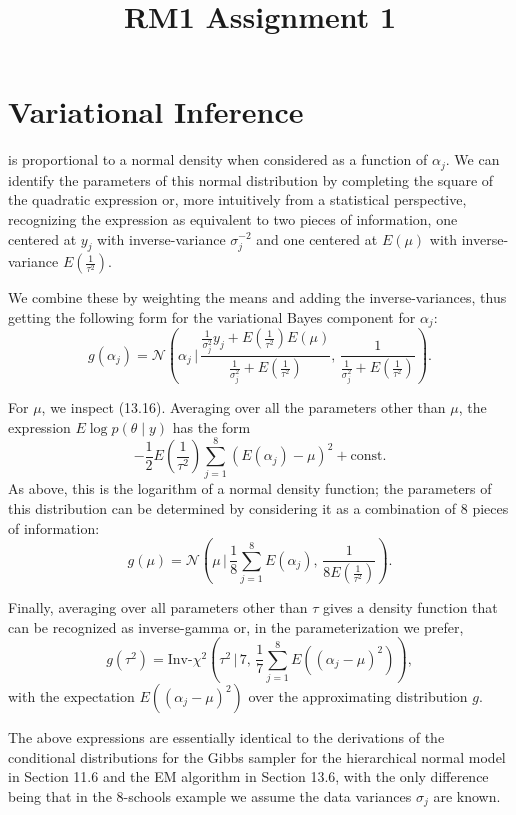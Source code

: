 \documentclass{article}
\title{RM1 Assignment 1}
\begin{document}
\section*{Variational Inference}

is proportional to a normal density when considered as a function of $\alpha_j$. We can 
identify the parameters of this normal distribution by completing the square of the 
quadratic expression or, more intuitively from a statistical perspective, recognizing the 
expression as equivalent to two pieces of information, one centered at $y_j$ 
with inverse-variance $\sigma_j^{-2}$ and one centered at $E(\mu)$ with inverse-variance 
$E(\frac{1}{\tau^2})$. 

We combine these by weighting the means and adding the inverse-variances, thus 
getting the following form for the variational Bayes component for $\alpha_j$:
\[
g(\alpha_j) = \mathcal{N}\left(\alpha_j \, \Bigg| \, 
\frac{\frac{1}{\sigma_j^2}y_j + E\left(\frac{1}{\tau^2}\right)E(\mu)}
{\frac{1}{\sigma_j^2} + E\left(\frac{1}{\tau^2}\right)}, \,
\frac{1}{\frac{1}{\sigma_j^2} + E\left(\frac{1}{\tau^2}\right)} 
\right). \tag{13.18}
\]

For $\mu$, we inspect (13.16). Averaging over all the parameters other than $\mu$, the 
expression $E \log p(\theta \mid y)$ has the form 
\[
-\frac{1}{2}E\left(\frac{1}{\tau^2}\right) \sum_{j=1}^8 (E(\alpha_j) - \mu)^2 + \text{const}.
\]
As above, this is the logarithm of a normal density function; the parameters of this distribution 
can be determined by considering it as a combination of 8 pieces of information:
\[
g(\mu) = \mathcal{N}\left(\mu \, \Bigg| \, 
\frac{1}{8} \sum_{j=1}^8 E(\alpha_j), \,
\frac{1}{8 E\left(\frac{1}{\tau^2}\right)} 
\right). \tag{13.19}
\]

Finally, averaging over all parameters other than $\tau$ gives a density function that 
can be recognized as inverse-gamma or, in the parameterization we prefer,
\[
g(\tau^2) = \text{Inv-}\chi^2\left(\tau^2 \, \Bigg| \, 
7, \, 
\frac{1}{7} \sum_{j=1}^8 E\left((\alpha_j - \mu)^2\right) 
\right), \tag{13.20}
\]
with the expectation $E\left((\alpha_j - \mu)^2\right)$ over the approximating distribution $g$.

The above expressions are essentially identical to the derivations of the conditional 
distributions for the Gibbs sampler for the hierarchical normal model in Section 11.6 
and the EM algorithm in Section 13.6, with the only difference being that in the 
8-schools example we assume the data variances $\sigma_j$ are known.
\end{document}

